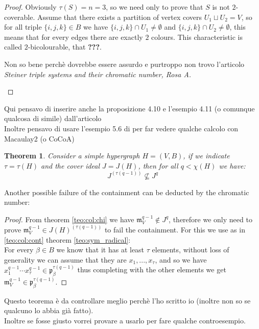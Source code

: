 \documentclass[a4wide]{book}
\theoremstyle{plain}
\newtheorem{teo}{Theorem}[section]
\theoremstyle{remark}
\theoremstyle{definition}
\newcommand{\p}{\mathfrak{p}}
\newcommand{\mm}{\mathfrak{m}}
\newcounter{que}
\begin{document}
\begin{proof}
Obviously $ \tau(S)=n=3 $, so we need only to prove that $ S $ is not $ 2 $-coverable. Assume that there exists a partition of vertex covers $ U_1 \sqcup U_2 = V $, so for all triple $ \{ i , j, k\} \in B $ we have $ \{ i , j, k\} \cap U_1 \neq \emptyset $ and $ \{ i , j, k\} \cap U_2 \neq \emptyset $, this means that for every edges there are exactly $ 2 $ colours. This characteristic is called $ 2 $-bicolourable, that \textbf{???}. 
\begin{tboxque}
Non so bene perchè dovrebbe essere assurdo e purtroppo non trovo l'articolo \textit{Steiner triple systems and their chromatic number, Rosa A.}
\end{tboxque}
\end{proof}

\begin{tboxtodo}
Qui pensavo di inserire anche la proposizione 4.10 e l'esempio 4.11 (o comunque qualcosa di simile) dall'articolo \cite{Bal21Steiner}\\
Inoltre pensavo di usare l'esempio 5.6 di \cite{Bal20Steiner} per far vedere qualche calcolo con Macaulay2 \cite{M2} (o CoCoA)
\end{tboxtodo}

\begin{teo} \label{teo:borin1}
	Consider a simple hypergraph $H = (V,B)$, if we indicate $\tau = \tau (H)$ and the cover ideal $ J = J(H)$,  then for all $ q < \chi(H)$ we have: 
	\[ J^{( \tau(q-1) )} \not \subseteq J^q \]
\end{teo}

Another possible failure of the containment can be deducted by the chromatic number:

\begin{proof}
	From theorem \ref{teo:col:chi} we have $\mm_V^{q-1} \not \in J^q$, therefore we only need to prove $ \mm_V^{q-1} \in J(H)^{( \tau (q-1) )}$ to fail the containment. For this we use as in \ref{teo:col:cont} theorem \ref{teo:sym_radical}:\\
	For every $\beta \in B $ we know that it has at least $	\tau$ elements, without loss of generality we can assume that they are $x_1 , ... , x_\tau$, and so we have $x_1^{q-1} \cdots  x_\tau^{q-1} \in \p_\beta^{\tau(q -1)} $ thus completing with the other elements we get $\mm_V^{q-1} \in \p_\beta^{\tau(q -1)} $. 
\end{proof} 

\begin{tboxtodo}
Questo teorema è da controllare meglio perchè l'ho scritto io (inoltre non so se qualcuno lo abbia già fatto).\\
Inoltre se fosse giusto vorrei provare a usarlo per fare qualche controesempio. 
\end{tboxtodo}


\backmatter
\printbibliography
\end{document}
